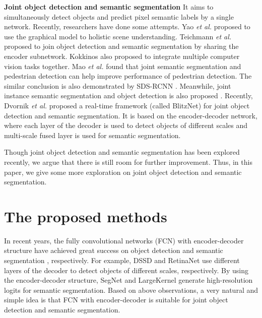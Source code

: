 \documentclass[10pt,twocolumn,letterpaper]{article}
\begin{document}
\textbf{Joint object detection and semantic segmentation} It aims to simultaneously detect objects and predict pixel semantic labels by a single network. Recently, researchers have done some attempts. Yao \textit{et al.} \cite{Yao_JOSS_CVPR_2012} proposed to use the graphical model to holistic scene understanding. Teichmann \textit{et al.} \cite{Teichmann_Multinet_arXiv_2016} proposed to join object detection and semantic segmentation by sharing the encoder subnetwork. Kokkinos \cite{Kokkions_UberNet_CVPR_2017} also proposed to integrate multiple computer vision tasks together. Mao \textit{et al.} \cite{Mao_Hyper_CVPR_2017} found that joint semantic segmentation and pedestrian detection can help improve performance of pedestrian detection. The similar conclusion is also demonstrated by SDS-RCNN \cite{Brazil_SDSRCNN_ICCV_2017}. Meanwhile, joint instance semantic segmentation and object detection is also proposed \cite{Dvornik_Blitznet_ICCV_2017}.
Recently, Dvornik \textit{et al.} \cite{Dvornik_Blitznet_ICCV_2017} proposed a real-time framework (called BlitzNet) for joint object detection and semantic segmentation. It is based on the encoder-decoder network, where each layer of the decoder is used to detect objects of different scales and multi-scale fused layer is used for semantic segmentation. 

Though joint object detection and semantic segmentation has been explored recently, we argue that there is still room for further improvement. Thus, in this paper, we give some more exploration on joint object detection and semantic segmentation.

\section{The proposed methods}
\label{secOurMethods}
In recent years, the fully convolutional networks (FCN) with encoder-decoder structure have achieved great success on object detection \cite{Lin_Focal_ICCV_2017,Fu_DSSD_arXiv_2017} and semantic segmentation \cite{Badrinarayanan_SegNet_PAMI_2017}, respectively. For example, DSSD \cite{Fu_DSSD_arXiv_2017,Pinheiro_ROS_ECCV_2016} and RetinaNet \cite{Lin_Focal_ICCV_2017} use different layers of the decoder to detect objects of different scales, respectively. By using the  encoder-decoder structure, SegNet \cite{Badrinarayanan_SegNet_PAMI_2017} and LargeKernel \cite{Peng_Largekernl_CVPR_2017} generate high-resolution logits for semantic segmentation. Based on above observations, a very natural and simple idea is that FCN with encoder-decoder is suitable for joint object detection and semantic segmentation.
\end{document}
